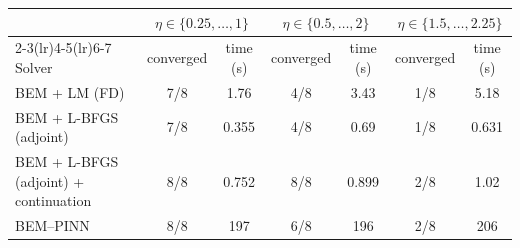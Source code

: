 \begin{tabular}{lcccccc}
\toprule
 & \multicolumn{2}{c}{$\eta\in\{0.25,\dots,1\}$} & \multicolumn{2}{c}{$\eta\in\{0.5,\dots,2\}$} & \multicolumn{2}{c}{$\eta\in\{1.5,\dots,2.25\}$}\\
\cmidrule(lr){2-3}\cmidrule(lr){4-5}\cmidrule(lr){6-7}
Solver & converged & time (s) & converged & time (s) & converged & time (s)\\
\midrule
BEM + LM (FD) & 7/8 & 1.76 & 4/8 & 3.43 & 1/8 & 5.18\\
BEM + L-BFGS (adjoint) & 7/8 & 0.355 & 4/8 & 0.69 & 1/8 & 0.631\\
BEM + L-BFGS (adjoint) + continuation & 8/8 & 0.752 & 8/8 & 0.899 & 2/8 & 1.02\\
BEM--PINN & 8/8 & 197 & 6/8 & 196 & 2/8 & 206\\
\bottomrule
\end{tabular}
